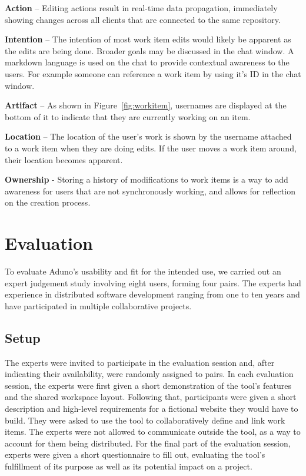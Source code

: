 \documentclass[conference]{IEEEtran}
\begin{document}
{\bf Action} – Editing actions result in real-time data propagation, immediately showing changes across all clients that are connected to the same repository.  

{\bf Intention} – The intention of most work item edits would likely be apparent as the edits are being done. Broader goals may be discussed in the chat window. A markdown language is used on the chat to provide contextual awareness to the users.  For example someone can reference a work item by using it's ID in the chat window.
 
{\bf Artifact} – As shown in Figure~\ref{fig:workitem}, usernames are displayed at the bottom of it to indicate that they are currently working on an item.

{\bf Location} – The location of the user’s work is shown by the username attached to a work item when they are doing edits. If the user moves a work item around, their location becomes apparent.

{\bf Ownership} - Storing a history of modifications to work items is a way to add awareness for users that are not synchronously working, and allows for reflection on the creation process.

\section{Evaluation}

To evaluate Aduno's usability and fit for the intended use, we carried out an expert judgement study involving eight users, forming four pairs. The experts had experience in distributed software development ranging from one to ten years and have participated in multiple collaborative projects.

\subsection{Setup}
The experts were invited to participate in the evaluation session and, after indicating their availability, were randomly assigned to pairs. In each evaluation session, the experts were first given a short demonstration of the tool's features and the shared workspace layout. Following that, participants were given a short description and high-level requirements for a fictional website they would have to build. They were asked to use the tool to collaboratively define and link work items. The experts were not allowed to communicate outside the tool, as a way to account for them being distributed. For the final part of the evaluation session, experts were given a short questionnaire to fill out, evaluating the tool's fulfillment of its purpose as well as its potential impact on a project.
\end{document}
